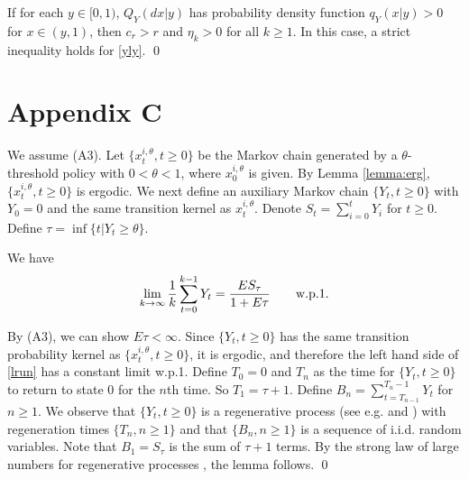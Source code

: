 \documentclass[graybox]{svmult}
\begin{document}
\begin{remark}\label{rem:b1}
If for each $y\in [0, 1)$,  $Q_Y(dx|y)$ has probability density function $q_Y(x|y)>0$ for $x\in (y, 1)$, then $c_r>r$ and $\eta_k>0$ for all $k\ge 1$. In this case, a strict inequality holds for \eqref{yly}. \qed
\end{remark}

\section*{Appendix C}
\label{sec:proofz}

\renewcommand{\theequation}{C.\arabic{equation}}
\setcounter{equation}{0}
\renewcommand{\thetheorem}{C.\arabic{theorem}}
\setcounter{theorem}{0}
\renewcommand{\thelemma}{C.\arabic{lemma}}
\setcounter{lemma}{0}
\renewcommand{\thesubsection}{C.\arabic{subsection}}
\setcounter{subsection}{0}
\renewcommand{\theremark}{C.\arabic{remark}}
\setcounter{remark}{0}


We assume (A3).
Let $\{x_t^{i,\theta}, t\ge 0\}$ be the Markov chain generated by  a
$\theta$-threshold policy with  $0<\theta<1$, where $x_0^{i,\theta}$ is given.
By Lemma \ref{lemma:erg},  $\{x_t^{i,\theta}, t\ge 0\}$ is  ergodic.
 We next define an auxiliary  Markov chain $\{Y_t, t\ge 0\}$ with $Y_0=0$ and the same transition kernel as $x_t^{i,\theta}$.
Denote
$
S_t =\sum_{i=0}^t Y_i
$ for $t\ge 0$.
Define $\tau=\inf\{t|Y_t \ge \theta\}$.


\begin{lemma} \label{lemma:YS}
We have
\begin{align}
\lim_{k\to \infty}\frac{1}{k} \sum_{t=0}^{k-1} Y_t= \frac{ES_\tau}
{ 1+E\tau} \qquad{\rm  w.p.1}.  \label{lrun}
\end{align}
\end{lemma}

\proof By (A3), we can show $E\tau <\infty$.   Since $\{Y_t, t\ge 0\}$ has the same transition probability kernel as $\{x_t^{i, \theta}, t\ge 0 \}$, it is ergodic, and therefore the left hand side of \eqref{lrun} has a constant limit   w.p.1.
Define $T_0=0$ and $T_n$ as the time for $\{Y_t, t\ge 0\}$ to return to state 0 for the $n$th time. So $T_1=\tau+1$.  Define  $B_n= \sum_{t= T_{n-1}}^{T_n-1} Y_t$ for $n\ge 1$. We observe that $\{Y_t, t\ge 0\}$ is a regenerative process
(see e.g. \cite{A03,SW93} and \cite[Theorem 4]{AR14})
 with regeneration times $\{T_n, n\ge 1\}$ and that $\{B_n, n\ge 1\}$ is a sequence of i.i.d. random variables. Note that $B_1=S_\tau $ is the sum of $\tau+1$ terms. By the strong  law of large numbers for regenerative processes \cite[pp. 177]{A03},
 the lemma follows. \qed
\end{document}

